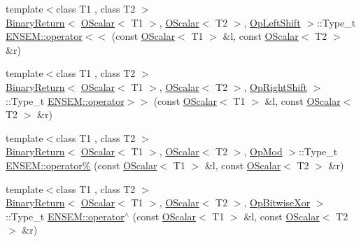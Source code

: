 \begin{DoxyCompactItemize}
\item 
{\footnotesize template$<$class T1 , class T2 $>$ }\\\mbox{\hyperlink{structENSEM_1_1BinaryReturn}{Binary\+Return}}$<$ \mbox{\hyperlink{classENSEM_1_1OScalar}{O\+Scalar}}$<$ T1 $>$, \mbox{\hyperlink{classENSEM_1_1OScalar}{O\+Scalar}}$<$ T2 $>$, \mbox{\hyperlink{structENSEM_1_1OpLeftShift}{Op\+Left\+Shift}} $>$\+::Type\+\_\+t \mbox{\hyperlink{group__obsscalar_ga4e9caae1c3f8de5f5a7066462fdbd391}{E\+N\+S\+E\+M\+::operator$<$$<$}} (const \mbox{\hyperlink{classENSEM_1_1OScalar}{O\+Scalar}}$<$ T1 $>$ \&l, const \mbox{\hyperlink{classENSEM_1_1OScalar}{O\+Scalar}}$<$ T2 $>$ \&r)
\item 
{\footnotesize template$<$class T1 , class T2 $>$ }\\\mbox{\hyperlink{structENSEM_1_1BinaryReturn}{Binary\+Return}}$<$ \mbox{\hyperlink{classENSEM_1_1OScalar}{O\+Scalar}}$<$ T1 $>$, \mbox{\hyperlink{classENSEM_1_1OScalar}{O\+Scalar}}$<$ T2 $>$, \mbox{\hyperlink{structENSEM_1_1OpRightShift}{Op\+Right\+Shift}} $>$\+::Type\+\_\+t \mbox{\hyperlink{group__obsscalar_ga015e8600020030e6443b821a8064e644}{E\+N\+S\+E\+M\+::operator$>$$>$}} (const \mbox{\hyperlink{classENSEM_1_1OScalar}{O\+Scalar}}$<$ T1 $>$ \&l, const \mbox{\hyperlink{classENSEM_1_1OScalar}{O\+Scalar}}$<$ T2 $>$ \&r)
\item 
{\footnotesize template$<$class T1 , class T2 $>$ }\\\mbox{\hyperlink{structENSEM_1_1BinaryReturn}{Binary\+Return}}$<$ \mbox{\hyperlink{classENSEM_1_1OScalar}{O\+Scalar}}$<$ T1 $>$, \mbox{\hyperlink{classENSEM_1_1OScalar}{O\+Scalar}}$<$ T2 $>$, \mbox{\hyperlink{structENSEM_1_1OpMod}{Op\+Mod}} $>$\+::Type\+\_\+t \mbox{\hyperlink{group__obsscalar_ga8cba513c40a3014718affb28b883351e}{E\+N\+S\+E\+M\+::operator\%}} (const \mbox{\hyperlink{classENSEM_1_1OScalar}{O\+Scalar}}$<$ T1 $>$ \&l, const \mbox{\hyperlink{classENSEM_1_1OScalar}{O\+Scalar}}$<$ T2 $>$ \&r)
\item 
{\footnotesize template$<$class T1 , class T2 $>$ }\\\mbox{\hyperlink{structENSEM_1_1BinaryReturn}{Binary\+Return}}$<$ \mbox{\hyperlink{classENSEM_1_1OScalar}{O\+Scalar}}$<$ T1 $>$, \mbox{\hyperlink{classENSEM_1_1OScalar}{O\+Scalar}}$<$ T2 $>$, \mbox{\hyperlink{structENSEM_1_1OpBitwiseXor}{Op\+Bitwise\+Xor}} $>$\+::Type\+\_\+t \mbox{\hyperlink{group__obsscalar_gaa01a2cce660b21ea1e2ea9a876a1cd03}{E\+N\+S\+E\+M\+::operator$^\wedge$}} (const \mbox{\hyperlink{classENSEM_1_1OScalar}{O\+Scalar}}$<$ T1 $>$ \&l, const \mbox{\hyperlink{classENSEM_1_1OScalar}{O\+Scalar}}$<$ T2 $>$ \&r)

\end{DoxyCompactItemize}
